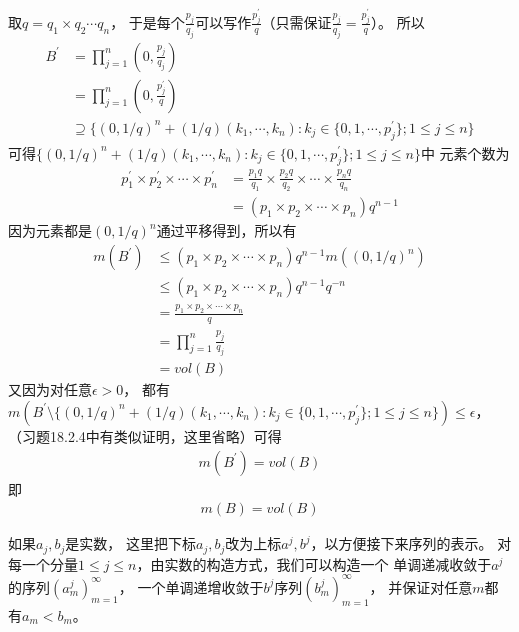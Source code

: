 \documentclass{article}
\begin{document}
取$q = q_1 \times q_2 \cdots q_n$，
于是每个$\frac{p_j}{q_j}$可以写作$\frac{p_j^\prime}{q}$（只需保证$\frac{p_j}{q_j} = \frac{p_j^\prime}{q}$）。
所以
\begin{align*}
  B^\prime & = \prod\limits_{j = 1}^n (0, \frac{p_j}{q_j})                                                            \\
           & = \prod\limits_{j = 1}^n (0, \frac{p_j^\prime}{q})                                                       \\
           & \supseteq \{(0, 1/q)^n + (1/q)(k_1,\cdots, k_n): k_j \in \{0, 1, \cdots, p_j^\prime\}; 1 \leq j \leq n\}
\end{align*}
可得$\{(0, 1/q)^n + (1/q)(k_1,\cdots, k_n): k_j \in \{0, 1, \cdots, p_j^\prime\}; 1 \leq j \leq n\}$中
元素个数为
\begin{align*}
  p_1^\prime \times p_2^\prime \times \cdots \times p_n^\prime
   & = \frac{p_1 q}{q_1} \times \frac{p_2 q}{q_2} \times \cdots \times \frac{p_n q}{q_n} \\
   & = (p_1 \times p_2 \times \cdots \times p_n)q^{n - 1}
\end{align*}
因为元素都是$(0, 1/q)^n$通过平移得到，所以有
\begin{align*}
  m(B^\prime) & \leq (p_1 \times p_2 \times \cdots \times p_n)q^{n - 1} m((0, 1/q)^n) \\
              & \leq (p_1 \times p_2 \times \cdots \times p_n)q^{n - 1} q^{-n}        \\
              & = \frac{p_1 \times p_2 \times \cdots \times p_n}{q}                   \\
              & = \prod\limits_{j = 1}^n \frac{p_j}{q_j}                              \\
              & = vol(B)
\end{align*}
又因为对任意$\epsilon > 0$，
都有$m(B^\prime \setminus \{(0, 1/q)^n + (1/q)(k_1,\cdots, k_n): k_j \in \{0, 1, \cdots, p_j^\prime\}; 1 \leq j \leq n\}) \leq \epsilon$，
（习题18.2.4中有类似证明，这里省略）可得
\begin{align*}
  m(B^\prime) = vol(B)
\end{align*}
即
\begin{align*}
  m(B) = vol(B)
\end{align*}

如果$a_j, b_j$是实数，
这里把下标$a_j, b_j$改为上标$a^j, b^j$，以方便接下来序列的表示。
对每一个分量$1 \leq j \leq n$，由实数的构造方式，我们可以构造一个
单调递减收敛于$a^j$的序列$(a_m^j)_{m = 1}^\infty$，
一个单调递增收敛于$b^j$序列$(b_m^j)_{m = 1}^\infty$，
并保证对任意$m$都有$a_m < b_m$。
\end{document}
